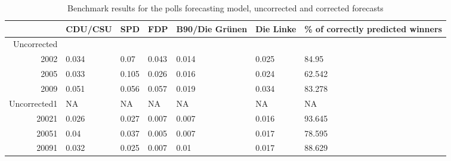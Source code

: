 \begin{table}[t!]
\centering
\caption{Benchmark results for the polls forecasting model, uncorrected and corrected forecasts} 
\begin{tabular}{rllllll}
  \hline
 & CDU/CSU & SPD & FDP & B90/Die Gr\"unen & Die Linke & \% of correctly predicted winners \\ 
  \hline
Uncorrected &  &  &  &  &  &  \\ 
  2002 & 0.034 & 0.07 & 0.043 & 0.014 & 0.025 & 84.95 \\ 
  2005 & 0.033 & 0.105 & 0.026 & 0.016 & 0.024 & 62.542 \\ 
  2009 & 0.051 & 0.056 & 0.057 & 0.019 & 0.034 & 83.278 \\ 
  Uncorrected1 &  NA &  NA &  NA &  NA &  NA &  NA \\ 
  20021 & \cellcolor{gray!25} 0.026 & \cellcolor{gray!25} 0.027 & \cellcolor{gray!25} 0.007 & \cellcolor{gray!25} 0.007 & \cellcolor{gray!25} 0.016 &  93.645 \\ 
  20051 &  0.04 & \cellcolor{gray!25} 0.037 & \cellcolor{gray!25} 0.005 & \cellcolor{gray!25} 0.007 & \cellcolor{gray!25} 0.017 &  78.595 \\ 
  20091 & \cellcolor{gray!25} 0.032 & \cellcolor{gray!25} 0.025 & \cellcolor{gray!25} 0.007 & \cellcolor{gray!25} 0.01 & \cellcolor{gray!25} 0.017 &  88.629 \\ 
   \hline
\end{tabular}
\end{table}
